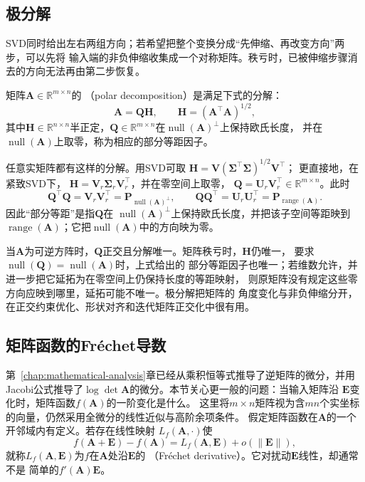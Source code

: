 \subsection{极分解}

SVD同时给出左右两组方向；若希望把整个变换分成“先伸缩、再改变方向”两步，可以先将
输入端的非负伸缩收集成一个对称矩阵。秩亏时，已被伸缩步骤消去的方向无法再由第二步恢复。

\begin{definition}[极分解与部分等距因子]
\label{def:matrix-analysis-polar-decomposition}
矩阵$\bm{A}\in\mathbb{R}^{m\times n}$的
（polar decomposition）是满足下式的分解：
\begin{equation}
  \bm{A}=\bm{Q}\bm{H},
  \qquad
  \bm{H}=(\bm{A}^{\top}\bm{A})^{1/2},
  \label{eq:matrix-analysis-polar-decomposition}
\end{equation}
其中$\bm{H}\in\mathbb R^{n\times n}$半正定，$\bm{Q}\in\mathbb R^{m\times n}$在$\operatorname{null}(\bm A)^{\perp}$上保持欧氏长度，
并在$\operatorname{null}(\bm A)$上取零，称为相应的部分等距因子。
\end{definition}
任意实矩阵都有这样的分解。用SVD可取
$\bm{H}=\bm{V}(\bm{\Sigma}^{\top}\bm{\Sigma})^{1/2}\bm{V}^{\top}$；
更直接地，在紧致SVD下，
$\bm{H}=\bm{V}_r\bm{\Sigma}_r\bm{V}_r^{\top}$，并在零空间上取零，
$\bm{Q}=\bm{U}_r\bm{V}_r^{\top}\in\mathbb{R}^{m\times n}$。此时
\[
  \bm{Q}^{\top}\bm{Q}
  =\bm{V}_r\bm{V}_r^{\top}
  =\bm{P}_{\operatorname{null}(\bm{A})^{\perp}},
  \qquad
  \bm{Q}\bm{Q}^{\top}
  =\bm{U}_r\bm{U}_r^{\top}
  =\bm{P}_{\operatorname{range}(\bm{A})}.
\]
因此“部分等距”是指$\bm{Q}$在
$\operatorname{null}(\bm{A})^{\perp}$上保持欧氏长度，并把该子空间等距映到
$\operatorname{range}(\bm{A})$；它把$\operatorname{null}(\bm{A})$中的方向映为零。

当$\bm{A}$为可逆方阵时，$\bm{Q}$正交且分解唯一。矩阵秩亏时，$\bm{H}$仍唯一，
要求$\operatorname{null}(\bm{Q})=\operatorname{null}(\bm{A})$时，上式给出的
部分等距因子也唯一；若维数允许，并进一步把它延拓为在零空间上仍保持长度的等距映射，
则原矩阵没有规定这些零方向应映到哪里，延拓可能不唯一。极分解把矩阵的
角度变化与非负伸缩分开，在正交约束优化、形状对齐和迭代矩阵正交化中很有用。

\subsection{矩阵函数的Fréchet导数}

第~\ref{chap:mathematical-analysis}章已经从乘积恒等式推导了逆矩阵的微分，并用
Jacobi公式推导了$\log\det\bm{A}$的微分。本节关心更一般的问题：当输入矩阵沿
$\bm{E}$变化时，矩阵函数$f(\bm{A})$的一阶变化是什么。
这里将$m\times n$矩阵视为含$mn$个实坐标的向量，仍然采用全微分的线性近似与高阶余项条件。
假定矩阵函数在$\bm A$的一个开邻域内有定义。若存在线性映射
$L_f(\bm{A},\cdot)$使
\begin{equation}
  f(\bm{A}+\bm{E})-f(\bm{A})
  =
  L_f(\bm{A},\bm{E})+o(\lVert\bm{E}\rVert),
  \label{eq:matrix-analysis-frechet-derivative}
\end{equation}
就称$L_f(\bm{A},\bm{E})$为$f$在$\bm{A}$处沿$\bm{E}$的
（Fréchet derivative）。它对扰动$\bm{E}$线性，却通常不是
简单的$f'(\bm{A})\bm{E}$。

